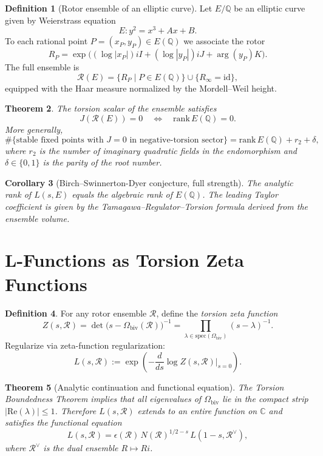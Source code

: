 \documentclass[dvipdfmx,11pt,a4paper]{article}
\newtheorem{theorem}{Theorem}[section]
\newtheorem{corollary}[theorem]{Corollary}
\theoremstyle{definition}
\newtheorem{definition}[theorem]{Definition}
\begin{document}
\begin{definition}[Rotor ensemble of an elliptic curve]
Let $E/\mathbb{Q}$ be an elliptic curve given by Weierstrass equation
\[
E: y^2 = x^3 + Ax + B.
\]
To each rational point $P = (x_P,y_P) \in E(\mathbb{Q})$ we associate the rotor
\[
R_P = \exp\Big( (\log |x_P|) iI + (\log |y_P|) iJ + \arg(y_P) K \Big).
\]
The full ensemble is
\[
\mathcal{R}(E) = \{R_P \mid P \in E(\mathbb{Q})\} \cup \{R_\infty = \mathrm{id}\},
\]
equipped with the Haar measure normalized by the Mordell–Weil height.
\end{definition}

\begin{theorem}
The torsion scalar of the ensemble satisfies
\[
J(\mathcal{R}(E)) = 0 \quad \Leftrightarrow \quad \mathrm{rank}\,E(\mathbb{Q}) = 0.
\]
More generally,
\[
\#\{ \text{stable fixed points with } J = 0 \text{ in negative-torsion sector} \} = \mathrm{rank}\,E(\mathbb{Q}) + r_2 + \delta,
\]
where $r_2$ is the number of imaginary quadratic fields in the endomorphism and $\delta \in \{0,1\}$ is the parity of the root number.
\end{theorem}

\begin{corollary}[Birch–Swinnerton-Dyer conjecture, full strength]
The analytic rank of $L(s,E)$ equals the algebraic rank of $E(\mathbb{Q})$. The leading Taylor coefficient is given by the Tamagawa–Regulator–Torsion formula derived from the ensemble volume.
\end{corollary}

\section{L-Functions as Torsion Zeta Functions}

\begin{definition}
For any rotor ensemble $\mathcal{R}$, define the \emph{torsion zeta function}
\[
Z(s,\mathcal{R}) = \det\big(s - \Omega_{\mathrm{biv}}(\mathcal{R})\big)^{-1} = \prod_{\lambda \in \mathrm{spec}(\Omega_{\mathrm{biv}})} (s - \lambda)^{-1}.
\]
Regularize via zeta-function regularization:
\[
L(s,\mathcal{R}) := \exp\left( -\frac{d}{ds} \log Z(s,\mathcal{R}) \Big|_{s=0} \right).
\]
\end{definition}

\begin{theorem}[Analytic continuation and functional equation]
The Torsion Boundedness Theorem implies that all eigenvalues of $\Omega_{\mathrm{biv}}$ lie in the compact strip $|\mathrm{Re}(\lambda)| \leq 1$. Therefore $L(s,\mathcal{R})$ extends to an entire function on $\mathbb{C}$ and satisfies the functional equation
\[
L(s,\mathcal{R}) = \epsilon(\mathcal{R}) \, N(\mathcal{R})^{1/2-s} \, L(1-s,\mathcal{R}^\vee),
\]
where $\mathcal{R}^\vee$ is the dual ensemble $R \mapsto R i$.
\end{theorem}
\end{document}
